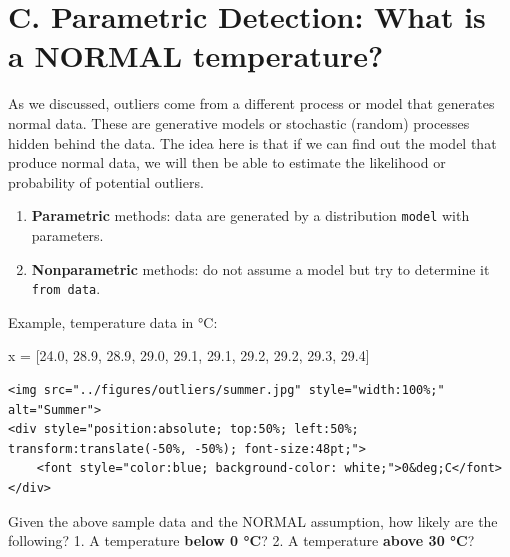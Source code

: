 \documentclass[
  letterpaper,
]{scrbook}
\newenvironment{Shaded}{\begin{snugshade}}{\end{snugshade}}
\newcommand{\FloatTok}[1]{\textcolor[rgb]{0.68,0.00,0.00}{#1}}
\newcommand{\NormalTok}[1]{\textcolor[rgb]{0.00,0.23,0.31}{#1}}
\newcommand{\OperatorTok}[1]{\textcolor[rgb]{0.37,0.37,0.37}{#1}}
\providecommand{\tightlist}{%
  \setlength{\itemsep}{0pt}\setlength{\parskip}{0pt}}
\begin{document}
\section*{C. Parametric Detection: What is a NORMAL
temperature?}\label{c.-parametric-detection-what-is-a-normal-temperature}


As we discussed, outliers come from a different process or model that
generates normal data. These are generative models or stochastic
(random) processes hidden behind the data. The idea here is that if we
can find out the model that produce normal data, we will then be able to
estimate the likelihood or probability of potential outliers.

\begin{enumerate}
\def\labelenumi{\arabic{enumi}.}
\tightlist
\item
  \textbf{Parametric} methods: data are generated by a distribution
  \texttt{model} with parameters.
\item
  \textbf{Nonparametric} methods: do not assume a model but try to
  determine it \texttt{from\ data}.
\end{enumerate}

Example, temperature data in °C:

\begin{Shaded}
\begin{Highlighting}[]
\NormalTok{ x }\OperatorTok{=}\NormalTok{ [}\FloatTok{24.0}\NormalTok{, }\FloatTok{28.9}\NormalTok{, }\FloatTok{28.9}\NormalTok{, }\FloatTok{29.0}\NormalTok{, }\FloatTok{29.1}\NormalTok{, }\FloatTok{29.1}\NormalTok{, }\FloatTok{29.2}\NormalTok{, }\FloatTok{29.2}\NormalTok{, }\FloatTok{29.3}\NormalTok{, }\FloatTok{29.4}\NormalTok{]}
\end{Highlighting}
\end{Shaded}

\begin{verbatim}
<img src="../figures/outliers/summer.jpg" style="width:100%;" alt="Summer">
<div style="position:absolute; top:50%; left:50%; transform:translate(-50%, -50%); font-size:48pt;">
    <font style="color:blue; background-color: white;">0&deg;C</font>
</div>
\end{verbatim}

Given the above sample data and the NORMAL assumption, how likely are
the following? 1. A temperature \textbf{below 0 °C}? 2. A temperature
\textbf{above 30 °C}?
\end{document}
